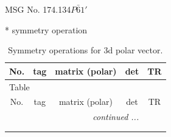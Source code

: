 \documentclass[fleqn,8pt]{jsarticle}
\begin{document}
\setcounter{MaxMatrixCols}{32}

\renewcommand{\tablename}{Table~}
\renewcommand{\figurename}{Figure~}
\begin{center}
\LARGE
MSG No. 174.134\quad$P\bar{6}1'$
\end{center}
* symmetry operation
\renewcommand{\arraystretch}{1.3}
\begin{longtable}{ccccc}
\caption{Symmetry operations for 3d polar vector.}
 \\
 \hline \hline
No. & tag & matrix (polar) & det & TR \\ \hline \endfirsthead

\multicolumn{4}{l}{\tablename\ \thetable{}} \\
 \hline \hline
No. & tag & matrix (polar) & det & TR \\ \hline \endhead

 \hline \hline
\multicolumn{4}{r}{\footnotesize\it continued ...} \\ \endfoot

 \hline \hline
\multicolumn{4}{r}{} \\ \endlastfoot


\end{longtable}
\end{document}
